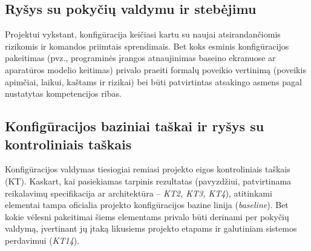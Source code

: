 \subsection{Ryšys su pokyčių valdymu ir stebėjimu}
Projektui vykstant, konfigūracija keičiasi kartu su naujai atsirandančiomis rizikomis ir komandos priimtais sprendimais. Bet koks esminis konfigūracijos pakeitimas (pvz., programinės įrangos atnaujinimas baseino ekranuose ar aparatūros modelio keitimas) privalo praeiti formalų poveikio vertinimą (poveikis apimčiai, laikui, kaštams ir rizikai) bei būti patvirtintas atsakingo asmens pagal nustatytas kompetencijos ribas.

\subsection{Konfigūracijos baziniai taškai ir ryšys su kontroliniais taškais}
Konfigūracijos valdymas tiesiogiai remiasi projekto eigos kontroliniais taškais (KT). Kaskart, kai pasiekiamas tarpinis rezultatas (pavyzdžiui, patvirtinama reikalavimų specifikacija ar architektūra – \emph{KT2, KT3, KT4}), atitinkami elementai tampa oficialia projekto konfigūracijos bazine linija (\emph{baseline}). Bet kokie vėlesni pakeitimai šiems elementams privalo būti derinami per pokyčių valdymą, įvertinant jų įtaką likusiems projekto etapams ir galutiniam sistemos perdavimui (\emph{KT14}).
